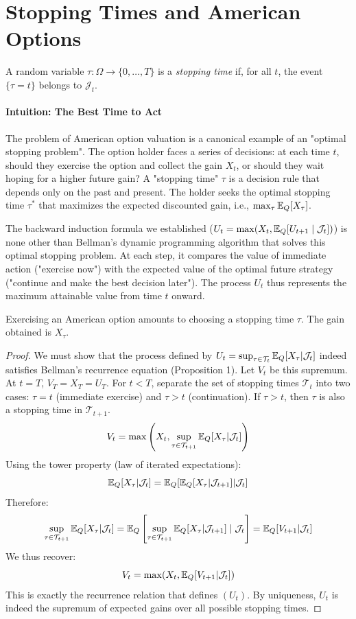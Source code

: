 \section{Stopping Times and American Options}

\begin{definition}
A random variable $\tau : \Omega \to \{0,\dots,T\}$ is a \emph{stopping time} if,
for all $t$, the event $\{\tau = t\}$ belongs to $\mathcal{J}_t$.
\end{definition}

\paragraph*{Intuition: The Best Time to Act}
The problem of American option valuation is a canonical example of an "optimal stopping problem". The option holder faces a series of decisions: at each time $t$, should they exercise the option and collect the gain $X_t$, or should they wait hoping for a higher future gain? A "stopping time" $\tau$ is a decision rule that depends only on the past and present. The holder seeks the optimal stopping time $\tau^*$ that maximizes the expected discounted gain, i.e., $\max_\tau \mathbb{E}_Q[X_\tau]$.

The backward induction formula we established ($U_t = \max(X_t, \mathbb{E}_Q[U_{t+1} \mid \mathcal{J}_t])$) is none other than Bellman's dynamic programming algorithm that solves this optimal stopping problem. At each step, it compares the value of immediate action ("exercise now") with the expected value of the optimal future strategy ("continue and make the best decision later"). The process $U_t$ thus represents the maximum attainable value from time $t$ onward.

Exercising an American option amounts to choosing a stopping time $\tau$.  
The gain obtained is $X_\tau$.  
\begin{proof}
We must show that the process defined by $U_t = \sup_{\tau \in \mathcal{T}_t} \mathbb{E}_Q[X_\tau | \mathcal{J}_t]$ indeed satisfies Bellman's recurrence equation (Proposition 1).
Let $V_t$ be this supremum.
At $t=T$, $V_T = X_T = U_T$.
For $t < T$, separate the set of stopping times $\mathcal{T}_t$ into two cases: $\tau = t$ (immediate exercise) and $\tau > t$ (continuation).
If $\tau > t$, then $\tau$ is also a stopping time in $\mathcal{T}_{t+1}$.
\[
V_t = \max \left( X_t, \sup_{\tau \in \mathcal{T}_{t+1}} \mathbb{E}_Q[X_\tau | \mathcal{J}_t] \right)
\]
Using the tower property (law of iterated expectations):
\[
\mathbb{E}_Q[X_\tau | \mathcal{J}_t] = \mathbb{E}_Q [ \mathbb{E}_Q[X_\tau | \mathcal{J}_{t+1}] | \mathcal{J}_t ]
\]
Therefore:
\[
\sup_{\tau \in \mathcal{T}_{t+1}} \mathbb{E}_Q[X_\tau | \mathcal{J}_t] = \mathbb{E}_Q \left[ \sup_{\tau \in \mathcal{T}_{t+1}} \mathbb{E}_Q[X_\tau | \mathcal{J}_{t+1}] \mid \mathcal{J}_t \right] = \mathbb{E}_Q[V_{t+1} | \mathcal{J}_t]
\]
We thus recover:
\[
V_t = \max(X_t, \mathbb{E}_Q[V_{t+1} | \mathcal{J}_t])
\]
This is exactly the recurrence relation that defines $(U_t)$. By uniqueness, $U_t$ is indeed the supremum of expected gains over all possible stopping times.
\end{proof}

